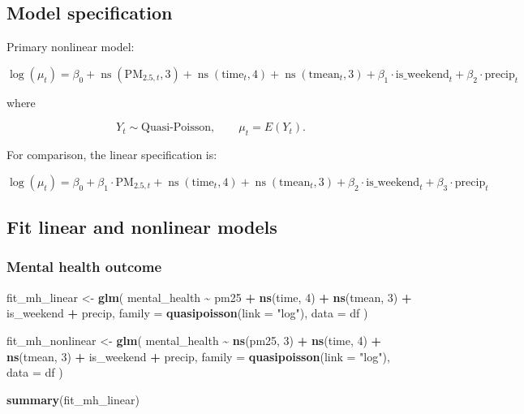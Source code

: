\documentclass[
]{article}
\newenvironment{Shaded}{\begin{snugshade}}{\end{snugshade}}
\newcommand{\AttributeTok}[1]{\textcolor[rgb]{0.13,0.29,0.53}{#1}}
\newcommand{\DecValTok}[1]{\textcolor[rgb]{0.00,0.00,0.81}{#1}}
\newcommand{\FunctionTok}[1]{\textcolor[rgb]{0.13,0.29,0.53}{\textbf{#1}}}
\newcommand{\NormalTok}[1]{#1}
\newcommand{\OtherTok}[1]{\textcolor[rgb]{0.56,0.35,0.01}{#1}}
\newcommand{\SpecialCharTok}[1]{\textcolor[rgb]{0.81,0.36,0.00}{\textbf{#1}}}
\newcommand{\StringTok}[1]{\textcolor[rgb]{0.31,0.60,0.02}{#1}}
\begin{document}
\subsection{Model specification}\label{model-specification}

Primary nonlinear model:

\[
\log(\mu_t) = \beta_0 + \operatorname{ns}(\mathrm{PM}_{2.5,t}, 3)
+ \operatorname{ns}(\mathrm{time}_t, 4)
+ \operatorname{ns}(\mathrm{tmean}_t, 3)
+ \beta_1 \cdot \mathrm{is\_weekend}_t
+ \beta_2 \cdot \mathrm{precip}_t
\]

where

\[
Y_t \sim \text{Quasi-Poisson}, \qquad \mu_t = E(Y_t).
\]

For comparison, the linear specification is:

\[
\log(\mu_t) = \beta_0 + \beta_1 \cdot \mathrm{PM}_{2.5,t}
+ \operatorname{ns}(\mathrm{time}_t, 4)
+ \operatorname{ns}(\mathrm{tmean}_t, 3)
+ \beta_2 \cdot \mathrm{is\_weekend}_t
+ \beta_3 \cdot \mathrm{precip}_t
\]

\subsection{Fit linear and nonlinear
models}\label{fit-linear-and-nonlinear-models}

\subsubsection{Mental health outcome}\label{mental-health-outcome}

\begin{Shaded}
\begin{Highlighting}[]
\NormalTok{fit\_mh\_linear }\OtherTok{\textless{}{-}} \FunctionTok{glm}\NormalTok{(}
\NormalTok{  mental\_health }\SpecialCharTok{\textasciitilde{}}\NormalTok{ pm25 }\SpecialCharTok{+} \FunctionTok{ns}\NormalTok{(time, }\DecValTok{4}\NormalTok{) }\SpecialCharTok{+} \FunctionTok{ns}\NormalTok{(tmean, }\DecValTok{3}\NormalTok{) }\SpecialCharTok{+}\NormalTok{ is\_weekend }\SpecialCharTok{+}\NormalTok{ precip,}
  \AttributeTok{family =} \FunctionTok{quasipoisson}\NormalTok{(}\AttributeTok{link =} \StringTok{"log"}\NormalTok{),}
  \AttributeTok{data =}\NormalTok{ df}
\NormalTok{)}

\NormalTok{fit\_mh\_nonlinear }\OtherTok{\textless{}{-}} \FunctionTok{glm}\NormalTok{(}
\NormalTok{  mental\_health }\SpecialCharTok{\textasciitilde{}} \FunctionTok{ns}\NormalTok{(pm25, }\DecValTok{3}\NormalTok{) }\SpecialCharTok{+} \FunctionTok{ns}\NormalTok{(time, }\DecValTok{4}\NormalTok{) }\SpecialCharTok{+} \FunctionTok{ns}\NormalTok{(tmean, }\DecValTok{3}\NormalTok{) }\SpecialCharTok{+}\NormalTok{ is\_weekend }\SpecialCharTok{+}\NormalTok{ precip,}
  \AttributeTok{family =} \FunctionTok{quasipoisson}\NormalTok{(}\AttributeTok{link =} \StringTok{"log"}\NormalTok{),}
  \AttributeTok{data =}\NormalTok{ df}
\NormalTok{)}

\FunctionTok{summary}\NormalTok{(fit\_mh\_linear)}
\end{Highlighting}
\end{Shaded}
\end{document}
